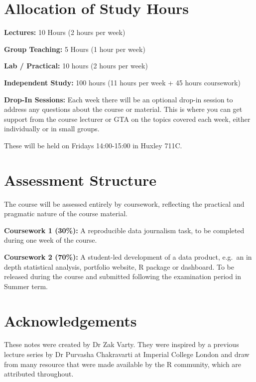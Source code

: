 \documentclass[
  letterpaper,
  DIV=11,
  numbers=noendperiod]{scrreprt}
\begin{document}
\section*{Allocation of Study Hours}\label{allocation-of-study-hours}


\textbf{Lectures:} 10 Hours (2 hours per week)

\textbf{Group Teaching:} 5 Hours (1 hour per week)

\textbf{Lab / Practical:} 10 hours (2 hours per week)

\textbf{Independent Study:} 100 hours (11 hours per week + 45 hours
coursework)

\textbf{Drop-In Sessions:} Each week there will be an optional drop-in
session to address any questions about the course or material. This is
where you can get support from the course lecturer or GTA on the topics
covered each week, either individually or in small groups.

These will be held on Fridays 14:00-15:00 in Huxley 711C.

\section*{Assessment Structure}\label{assessment-structure}


The course will be assessed entirely by coursework, reflecting the
practical and pragmatic nature of the course material.

\textbf{Coursework 1 (30\%):} A reproducible data journalism task, to be
completed during one week of the course.

\textbf{Coursework 2 (70\%):} A student-led development of a data
product, e.g.~an in depth statistical analysis, portfolio website, R
package or dashboard. To be released during the course and submitted
following the examination period in Summer term.

\section*{Acknowledgements}\label{acknowledgements}


These notes were created by Dr Zak Varty. They were inspired by a
previous lecture series by Dr Purvasha Chakravarti at Imperial College
London and draw from many resource that were made available by the R
community, which are attributed throughout.
\end{document}
